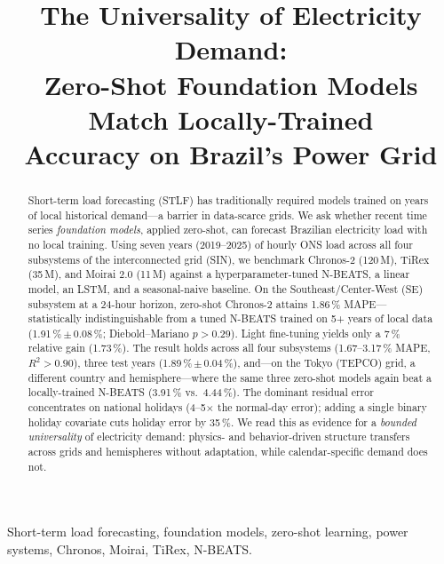\documentclass[conference]{IEEEtran}
\begin{document}
\title{The Universality of Electricity Demand:\\
Zero-Shot Foundation Models Match Locally-Trained\\
Accuracy on Brazil's Power Grid}

\author{
}

\maketitle

\begin{abstract}
Short-term load forecasting (STLF) has traditionally required models trained on years
of local historical demand---a barrier in data-scarce grids. We ask whether recent time
series \emph{foundation models}, applied zero-shot, can forecast Brazilian electricity
load with no local training. Using seven years (2019--2025) of hourly ONS load across
all four subsystems of the interconnected grid (SIN), we benchmark Chronos-2 (120\,M),
TiRex (35\,M), and Moirai 2.0 (11\,M) against a hyperparameter-tuned N-BEATS, a linear
model, an LSTM, and a seasonal-naive baseline. On the Southeast/Center-West (SE)
subsystem at a 24-hour horizon, zero-shot Chronos-2 attains 1.86\,\% MAPE---statistically
indistinguishable from a tuned N-BEATS trained on 5+ years of local data
(1.91\,\%\,$\pm$\,0.08\,\%; Diebold--Mariano $p>0.29$). Light fine-tuning yields only a
7\,\% relative gain (1.73\,\%). The result holds across all four subsystems (1.67--3.17\,\% MAPE,
$R^2>0.90$), three test years (1.89\,\%\,$\pm$\,0.04\,\%), and---on the Tokyo (TEPCO)
grid, a different country and hemisphere---where the same three zero-shot models again
beat a locally-trained N-BEATS (3.91\,\% vs.\ 4.44\,\%). The dominant residual error
concentrates on national holidays (4--5$\times$ the normal-day error); adding a single
binary holiday covariate cuts holiday error by 35\,\%. We read this as evidence for a
\emph{bounded universality} of electricity demand: physics- and behavior-driven
structure transfers across grids and hemispheres without adaptation, while
calendar-specific demand does not.
\end{abstract}

\begin{IEEEkeywords}
Short-term load forecasting, foundation models, zero-shot learning, power systems,
Chronos, Moirai, TiRex, N-BEATS.
\end{IEEEkeywords}
\end{document}
